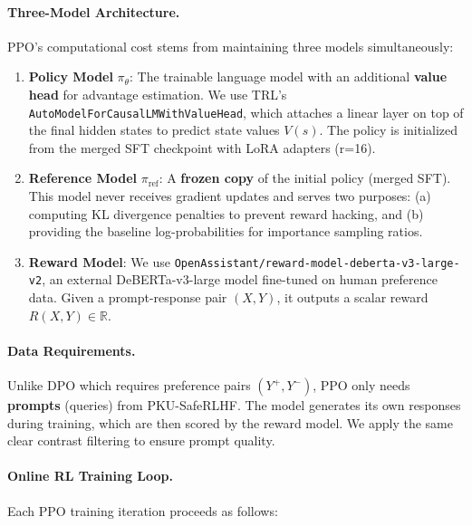 \paragraph{Three-Model Architecture.} PPO's computational cost stems from maintaining three models simultaneously:

\begin{enumerate}[leftmargin=*]
    \item \textbf{Policy Model} $\pi_\theta$: The trainable language model with an additional \textbf{value head} for advantage estimation. We use TRL's \texttt{AutoModelForCausalLMWithValueHead}, which attaches a linear layer on top of the final hidden states to predict state values $V(s)$. The policy is initialized from the merged SFT checkpoint with LoRA adapters (r=16).

    \item \textbf{Reference Model} $\pi_{\text{ref}}$: A \textbf{frozen copy} of the initial policy (merged SFT). This model never receives gradient updates and serves two purposes: (a) computing KL divergence penalties to prevent reward hacking, and (b) providing the baseline log-probabilities for importance sampling ratios.

    \item \textbf{Reward Model}: We use \texttt{OpenAssistant/reward-model-deberta-v3-large-v2}, an external DeBERTa-v3-large model fine-tuned on human preference data. Given a prompt-response pair $(X, Y)$, it outputs a scalar reward $R(X, Y) \in \mathbb{R}$.
\end{enumerate}

\paragraph{Data Requirements.} Unlike DPO which requires preference pairs $(Y^+, Y^-)$, PPO only needs \textbf{prompts} (queries) from PKU-SafeRLHF. The model generates its own responses during training, which are then scored by the reward model. We apply the same clear contrast filtering to ensure prompt quality.

\paragraph{Online RL Training Loop.} Each PPO training iteration proceeds as follows:

